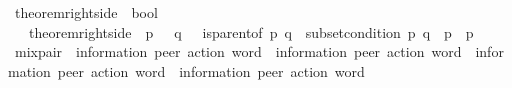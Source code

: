 \begin{isabellebody}
\isanewline
\isanewline
{}\isamarkupfalse%
\ theorem{\isacharunderscore}{\kern0pt}rightside\ {\isacharcolon}{\kern0pt}{\isacharcolon}{\kern0pt}\ {\isachardoublequoteopen}bool{\isachardoublequoteclose}\isanewline
\ \ \ {\isachardoublequoteopen}theorem{\isacharunderscore}{\kern0pt}rightside\ {\isasymlongleftrightarrow}\ {\isacharparenleft}{\kern0pt}{\isasymforall}p\ {\isasymin}\ {\isasymP}{\isachardot}{\kern0pt}\ {\isasymforall}q\ {\isasymin}\ {\isasymP}{\isachardot}{\kern0pt}\ {\isacharparenleft}{\kern0pt}{\isacharparenleft}{\kern0pt}is{\isacharunderscore}{\kern0pt}parent{\isacharunderscore}{\kern0pt}of\ p\ q{\isacharparenright}{\kern0pt}\ {\isasymlongrightarrow}\ {\isacharparenleft}{\kern0pt}{\isacharparenleft}{\kern0pt}subset{\isacharunderscore}{\kern0pt}condition\ p\ q{\isacharparenright}{\kern0pt}\ {\isasymand}\ {\isacharparenleft}{\kern0pt}{\isacharparenleft}{\kern0pt}{\isasymL}\isactrlsup {\isacharasterisk}{\kern0pt}{\isacharparenleft}{\kern0pt}p{\isacharparenright}{\kern0pt}{\isacharparenright}{\kern0pt}\ {\isacharequal}{\kern0pt}\ {\isacharparenleft}{\kern0pt}{\isasymL}\isactrlsup {\isacharasterisk}{\kern0pt}\isactrlsub {\isasymsqunion}\isactrlsub {\isasymsqunion}{\isacharparenleft}{\kern0pt}p{\isacharparenright}{\kern0pt}{\isacharparenright}{\kern0pt}{\isacharparenright}{\kern0pt}{\isacharparenright}{\kern0pt}\ {\isacharparenright}{\kern0pt}{\isacharparenright}{\kern0pt}{\isachardoublequoteclose}%
\isadelimdocument
%
\endisadelimdocument
%
\isatagdocument
%
\isamarkuptrue%
%
\endisatagdocument
{\isafolddocument}%
%
\isadelimdocument
%
\endisadelimdocument
{}\isamarkupfalse%
\ mix{\isacharunderscore}{\kern0pt}pair\ {\isacharcolon}{\kern0pt}{\isacharcolon}{\kern0pt}\ {\isachardoublequoteopen}{\isacharparenleft}{\kern0pt}{\isacharprime}{\kern0pt}information{\isacharcomma}{\kern0pt}\ {\isacharprime}{\kern0pt}peer{\isacharparenright}{\kern0pt}\ action\ word\ {\isasymRightarrow}\ {\isacharparenleft}{\kern0pt}{\isacharprime}{\kern0pt}information{\isacharcomma}{\kern0pt}\ {\isacharprime}{\kern0pt}peer{\isacharparenright}{\kern0pt}\ action\ word\ {\isasymRightarrow}\ {\isacharparenleft}{\kern0pt}{\isacharprime}{\kern0pt}information{\isacharcomma}{\kern0pt}\ {\isacharprime}{\kern0pt}peer{\isacharparenright}{\kern0pt}\ action\ word\ {\isasymRightarrow}\ {\isacharparenleft}{\kern0pt}{\isacharprime}{\kern0pt}information{\isacharcomma}{\kern0pt}\ {\isacharprime}{\kern0pt}peer{\isacharparenright}{\kern0pt}\ action\ word{\isachardoublequoteclose}\ \isanewline

\end{isabellebody}
